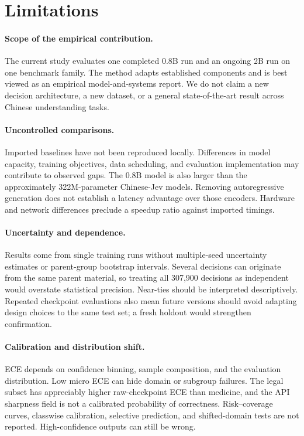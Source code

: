 \section{Limitations}
\label{sec:limits}
\paragraph{Scope of the empirical contribution.}
The current study evaluates one completed 0.8B run and an ongoing 2B run on one benchmark family. The method adapts established components and is best viewed as an empirical model-and-systems report. We do not claim a new decision architecture, a new dataset, or a general state-of-the-art result across Chinese understanding tasks.

\paragraph{Uncontrolled comparisons.}
Imported baselines have not been reproduced locally. Differences in model capacity, training objectives, data scheduling, and evaluation implementation may contribute to observed gaps. The 0.8B model is also larger than the approximately 322M-parameter Chinese-Jev models. Removing autoregressive generation does not establish a latency advantage over those encoders. Hardware and network differences preclude a speedup ratio against imported timings.

\paragraph{Uncertainty and dependence.}
Results come from single training runs without multiple-seed uncertainty estimates or parent-group bootstrap intervals. Several decisions can originate from the same parent material, so treating all 307,900 decisions as independent would overstate statistical precision. Near-ties should be interpreted descriptively. Repeated checkpoint evaluations also mean future versions should avoid adapting design choices to the same test set; a fresh holdout would strengthen confirmation.

\paragraph{Calibration and distribution shift.}
ECE depends on confidence binning, sample composition, and the evaluation distribution. Low micro ECE can hide domain or subgroup failures. The legal subset has appreciably higher raw-checkpoint ECE than medicine, and the API sharpness field is not a calibrated probability of correctness. Risk--coverage curves, classwise calibration, selective prediction, and shifted-domain tests are not reported. High-confidence outputs can still be wrong.


